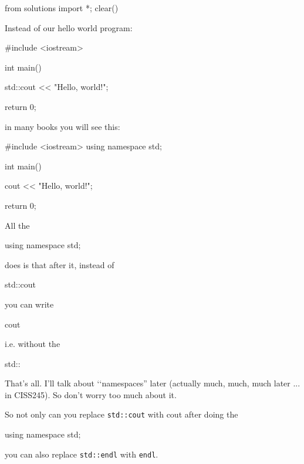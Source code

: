 \begin{python0}
from solutions import *; clear()
\end{python0}

Instead of our hello world program:
\begin{console}
#include <iostream>

int main()
{
    std::cout << "Hello, world!\n";

    return 0;
}
\end{console}
in many books you will see this:
\begin{console}
#include <iostream>
using namespace std;

int main()
{
    cout << "Hello, world!\n";

    return 0;
}
\end{console}

All the 
\begin{console}[frame=none]

        using namespace std;

\end{console}
does is that after it, instead of
\begin{console}[frame=none]

        std::cout

\end{console}
you can write
\begin{console}[frame=none]

        cout

\end{console}
i.e. without the 
\begin{console}[frame=none]

	std::

\end{console}
That's all. I'll talk about \lq\lq namespaces'' later (actually much, much, much later ... in CISS245). 
So don't worry too much about it. 




So not only can you replace \verb!std::cout! with cout after doing the 
\begin{console}[frame=none]

    using namespace std;

\end{console}
you can also replace \verb!std::endl! with \verb!endl!.

